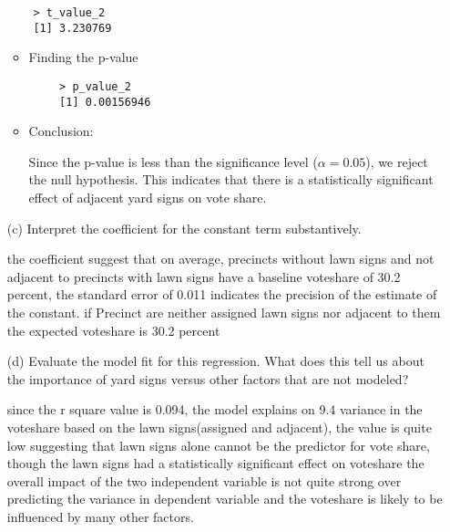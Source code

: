 \documentclass[12pt,letterpaper]{article}
\begin{document}
\begin{enumerate}
	
	\begin{verbatim}
	> t_value_2
	[1] 3.230769
	\end{verbatim}
	\begin{itemize}
		\item Finding the p-value
	\end{itemize}
		
	\begin{verbatim}
		> p_value_2
		[1] 0.00156946
	\end{verbatim}
	\begin{itemize}
	\item Conclusion:
	
	Since the p-value is less than the significance level (\(\alpha = 0.05\)), we reject the null hypothesis. This indicates that there is a statistically significant effect of adjacent yard signs on vote share.
	\end{itemize}
	
	\vspace{7cm}
	\item [(c)] Interpret the coefficient for the constant term substantively.
	
	the coefficient suggest that on average, precincts without lawn signs and not adjacent to precincts with lawn signs have a baseline voteshare of 30.2 percent, the standard error of 0.011 indicates the precision of the estimate of the constant. if Precinct are neither assigned lawn signs nor adjacent to them the expected voteshare is 30.2 percent
	\vspace{0.7cm}
	
	\item [(d)] Evaluate the model fit for this regression.  What does this	tell us about the importance of yard signs versus other factors that are not modeled?
	
	since the r square value is 0.094, the model explains on 9.4 variance in the voteshare based on the lawn signs(assigned and adjacent), the value is quite low suggesting that lawn signs alone cannot be the predictor for vote share, though the lawn signs had a statistically significant effect on voteshare the overall impact of the two independent variable is not quite strong over predicting the variance in dependent variable and the voteshare is likely to be influenced by many other factors. 
	
\end{enumerate}  
\end{document}
